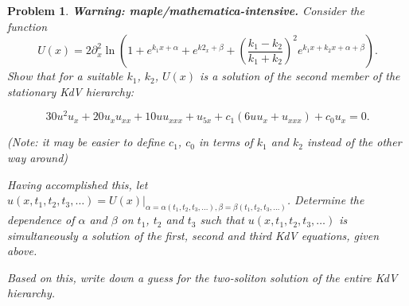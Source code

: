 \documentclass[12pt]{report}
\newtheorem{problem}{Problem}
\begin{document}
\newpage



\begin{problem}
    {\bf Warning: maple/mathematica-intensive.} Consider the function
$$
U(x)=2\partial_x^2\ln\left(1+e^{k_1
x+\alpha}+e^{k2_x+\beta}+\left(\frac{k_1-k_2}{k_1+k_2}\right)^2
e^{k_1x+k_2 x+\alpha+\beta}\right).
$$
Show that for a suitable $k_1$, $k_2$,
$U(x)$ is a solution of the second member of the stationary KdV hierarchy:

$$
30u^2u_x+20u_x u_{xx}+10u u_{xxx}+u_{5x}+c_1(6uu_x+u_{xxx})+c_0 u_x=0.
$$

\noindent (Note: it may be easier to define $c_1$, $c_0$ in terms of $k_1$ and
$k_2$ instead of the other way around)

\noindent Having accomplished this, let
$u(x,t_1,t_2,t_3,\ldots)=U(x)|_{\alpha=\alpha(t_1,t_2,t_3,\ldots),
\beta=\beta(t_1,t_2,t_3,\ldots)}$. Determine
the dependence of $\alpha$ and $\beta$ on $t_1$, $t_2$ and $t_3$ such that
$u(x,t_1,t_2,t_3,\ldots)$ is simultaneously a solution of the first, second and
third KdV equations, given above.

Based on this, write down a guess for the two-soliton solution of
the entire KdV hierarchy. 
\end{problem}
\end{document}
